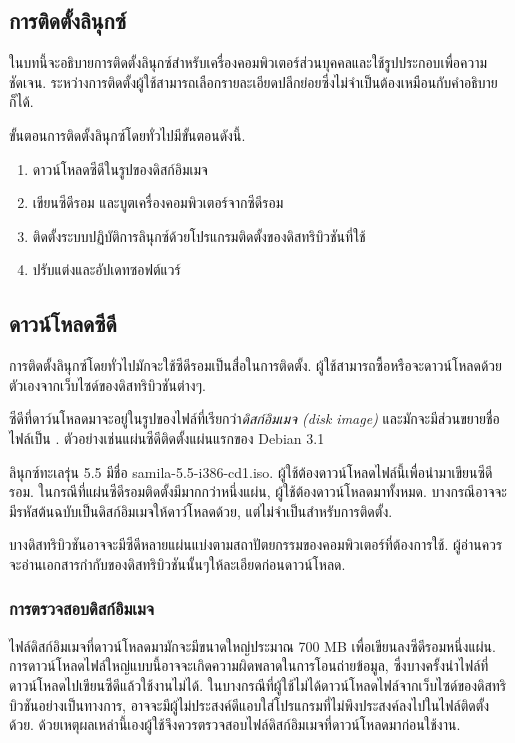 \begin{thwbr}
\chapter{การติดตั้งลินุกซ์}
ในบทนี้จะอธิบายการติดตั้งลินุกซ์สำหรับเครื่องคอมพิวเตอร์ส่วนบุคคลและใช้รูปประกอบเพื่อความชัดเจน. ระหว่างการติดตั้งผู้ใช้สามารถเลือกรายละเอียดปลีกย่อยซึ่งไม่จำเป็นต้องเหมือนกับคำอธิบายก็ได้.


ขั้นตอนการติดตั้งลินุกซ์โดยทั่วไปมีขั้นตอนดังนี้.
\begin{enumerate}
\item ดาวน์โหลดซีดีในรูปของดิสก์อิมเมจ
\item เขียนซีดีรอม และบูตเครื่องคอมพิวเตอร์จากซีดีรอม
\item ติดตั้งระบบปฏิบัติการลินุกซ์ด้วยโปรแกรมติดตั้งของดิสทริบิวชันที่ใช้
\item ปรับแต่งและอัปเดทซอฟต์แวร์
\end{enumerate}

\section{ดาวน์โหลดซีดี}
การติดตั้งลินุกซ์โดยทั่วไปมักจะใช้ซีดีรอมเป็นสื่อในการติดตั้ง. ผู้ใช้สามารถซื้อหรือจะดาวน์โหลดด้วยตัวเองจากเว็บไซด์ของดิสทริบิวชันต่างๆ.

ซีดีที่ดาว์นโหลดมาจะอยู่ในรูปของไฟล์ที่เรียกว่า\emph{ดิสก์อิมเมจ (disk image)} และมักจะมีส่วนขยายชื่อไฟล์เป็น . %
%
ตัวอย่างเช่นแผ่นซีดีติดตั้งแผ่นแรกของ Debian 3.1

ลินุกซ์ทะเลรุ่น 5.5 มีชื่อ samila-5.5-i386-cd1.iso. ผู้ใช้ต้องดาวน์โหลดไฟล์นี้เพื่อนำมาเขียนซีดีรอม. ในกรณีที่แผ่นซีดีรอมติดตั้งมีมากกว่าหนึ่งแผ่น, ผู้ใช้ต้องดาวน์โหลดมาทั้งหมด. บางกรณีอาจจะมีรหัสต้นฉบับเป็นดิสก์อิมเมจให้ดาว์โหลดด้วย, แต่ไม่จำเป็นสำหรับการติดตั้ง. 

บางดิสทริบิวชันอาจจะมีซีดีหลายแผ่นแบ่งตามสถาปัตยกรรมของคอมพิวเตอร์ที่ต้องการใช้. ผู้อ่านควรจะอ่านเอกสารกำกับของดิสทริบิวชันนั้นๆให้ละเอียดก่อนดาวน์โหลด.

\subsection{การตรวจสอบดิสก์อิมเมจ}
ไฟล์ดิสก์อิมเมจที่ดาวน์โหลดมามักจะมีขนาดใหญ่ประมาณ 700 MB เพื่อเขียนลงซีดีรอมหนึ่งแผ่น. การดาวน์โหลดไฟล์ใหญ่แบบนี้อาจจะเกิดความผิดพลาดในการโอนถ่ายข้อมูล, ซึ่งบางครั้งนำไฟล์ที่ดาวน์โหลดไปเขียนซีดีแล้วใช้งานไม่ได้. ในบางกรณีที่ผู้ใช้ไม่ได้ดาวน์โหลดไฟล์จากเว็บไซด์ของดิสทริบิวชันอย่างเป็นทางการ, อาจจะมีผู้ไม่ประสงค์ดีแอบใส่โปรแกรมที่ไม่พึงประสงค์ลงไปในไฟล์ติดตั้งด้วย. ด้วยเหตุผลเหล่านี้เองผู้ใช้จึงควรตรวจสอบไฟล์ดิสก์อิมเมจที่ดาวน์โหลดมาก่อนใช้งาน.


\end{thwbr}

